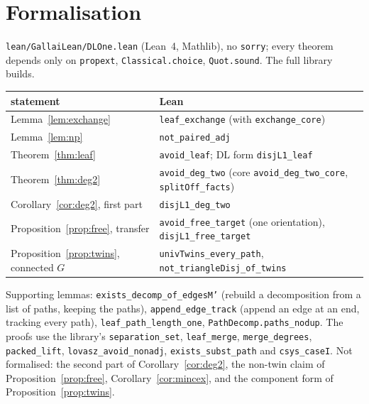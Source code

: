 \documentclass[11pt]{amsart}
\theoremstyle{definition}
\begin{document}
\section{Formalisation}\label{sec:lean}

\texttt{lean/GallaiLean/DLOne.lean} (Lean~4, Mathlib), no \texttt{sorry}; every theorem depends only
on \texttt{propext}, \texttt{Classical.choice}, \texttt{Quot.sound}. The full library builds.

\begin{center}\small
\begin{tabular}{ll}
\toprule
statement & Lean\\
\midrule
Lemma~\ref{lem:exchange} & \texttt{leaf\_exchange} (with \texttt{exchange\_core})\\
Lemma~\ref{lem:np} & \texttt{not\_paired\_adj}\\
Theorem~\ref{thm:leaf} & \texttt{avoid\_leaf}; DL form \texttt{disjL1\_leaf}\\
Theorem~\ref{thm:deg2} & \texttt{avoid\_deg\_two} (core \texttt{avoid\_deg\_two\_core}, \texttt{splitOff\_facts})\\
Corollary~\ref{cor:deg2}, first part & \texttt{disjL1\_deg\_two}\\
Proposition~\ref{prop:free}, transfer & \texttt{avoid\_free\_target} (one orientation), \texttt{disjL1\_free\_target}\\
Proposition~\ref{prop:twins}, connected $G$ & \texttt{univTwins\_every\_path}, \texttt{not\_triangleDisj\_of\_twins}\\
\bottomrule
\end{tabular}
\end{center}

Supporting lemmas: \texttt{exists\_decomp\_of\_edgesM'} (rebuild a decomposition from a list of paths,
keeping the paths), \texttt{append\_edge\_track} (append an edge at an end, tracking every path),
\texttt{leaf\_path\_length\_one}, \texttt{PathDecomp.paths\_nodup}. The proofs use the library's
\texttt{separation\_set}, \texttt{leaf\_merge}, \texttt{merge\_degrees}, \texttt{packed\_lift},
\texttt{lovasz\_avoid\_nonadj}, \texttt{exists\_subst\_path} and \texttt{csys\_caseI}. Not formalised:
the second part of Corollary~\ref{cor:deg2}, the non-twin claim of Proposition~\ref{prop:free},
Corollary~\ref{cor:mincex}, and the component form of Proposition~\ref{prop:twins}.
\end{document}
